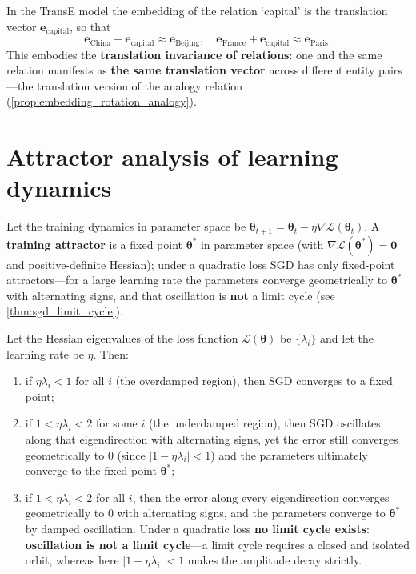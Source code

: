 \begin{example}\label{ex:transe_translation}
In the TransE model the embedding of the relation `capital' is the translation vector $\mathbf{e}_{\text{capital}}$, so that
\[
\mathbf{e}_{\text{China}}+\mathbf{e}_{\text{capital}}\approx\mathbf{e}_{\text{Beijing}},\quad
\mathbf{e}_{\text{France}}+\mathbf{e}_{\text{capital}}\approx\mathbf{e}_{\text{Paris}}.
\]
This embodies the \textbf{translation invariance of relations}: one and the same relation manifests as \textbf{the same translation vector} across different entity pairs---the translation version of the analogy relation (\cref{prop:embedding_rotation_analogy}).
\end{example}

\section{Attractor analysis of learning dynamics}
\label{sec:learning_attractor_analysis}

\begin{definition}\label{def:training_attractor}
Let the training dynamics in parameter space be $\boldsymbol{\theta}_{t+1}=\boldsymbol{\theta}_t-\eta\nabla\mathcal{L}(\boldsymbol{\theta}_t)$. A \textbf{training attractor} is a fixed point $\boldsymbol{\theta}^*$ in parameter space (with $\nabla\mathcal{L}(\boldsymbol{\theta}^*)=\mathbf{0}$ and positive-definite Hessian); under a quadratic loss SGD has only fixed-point attractors---for a large learning rate the parameters converge geometrically to $\boldsymbol{\theta}^*$ with alternating signs, and that oscillation is \textbf{not} a limit cycle (see \cref{thm:sgd_limit_cycle}).
\end{definition}

\begin{theorem}\label{thm:sgd_limit_cycle}
Let the Hessian eigenvalues of the loss function $\mathcal{L}(\boldsymbol{\theta})$ be $\{\lambda_i\}$ and let the learning rate be $\eta$. Then:
\begin{enumerate}[label=(\roman*)]
    \item if $\eta\lambda_i<1$ for all $i$ (the overdamped region), then SGD converges to a fixed point;
    \item if $1<\eta\lambda_i<2$ for some $i$ (the underdamped region), then SGD oscillates along that eigendirection with alternating signs, yet the error still converges geometrically to $0$ (since $|1-\eta\lambda_i|<1$) and the parameters ultimately converge to the fixed point $\boldsymbol{\theta}^*$;
    \item if $1<\eta\lambda_i<2$ for all $i$, then the error along every eigendirection converges geometrically to $0$ with alternating signs, and the parameters converge to $\boldsymbol{\theta}^*$ by damped oscillation. Under a quadratic loss \textbf{no limit cycle exists}: \textbf{oscillation is not a limit cycle}---a limit cycle requires a closed and isolated orbit, whereas here $|1-\eta\lambda_i|<1$ makes the amplitude decay strictly.
\end{enumerate}
\end{theorem}

